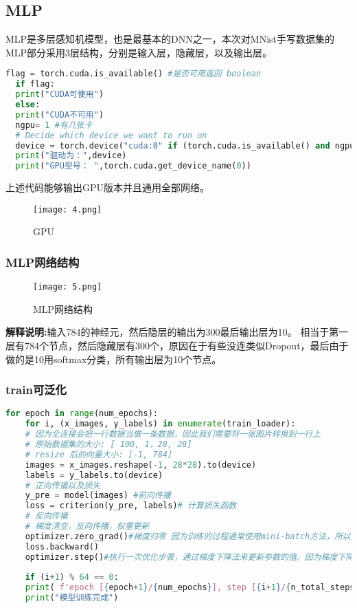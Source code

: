 \subsection{MLP}
 MLP是多层感知机模型，也是最基本的DNN之一，本次对MNist手写数据集的MLP部分采用3层结构，分别是输入层，隐藏层，以及输出层。\\
 \begin{lstlisting}[language=python]
  flag = torch.cuda.is_available() #是否可用返回 boolean
  if flag:
  print("CUDA可使用")
  else:
  print("CUDA不可用")
  ngpu= 1 #有几张卡
  # Decide which device we want to run on
  device = torch.device("cuda:0" if (torch.cuda.is_available() and ngpu > 0) else "cpu")
  print("驱动为：",device)
  print("GPU型号： ",torch.cuda.get_device_name(0))
 \end{lstlisting}
上述代码能够输出GPU版本并且通用全部网络。\\
	\begin{figure}[!h]
	\centering
	\texttt{[image: 4.png]}
	\caption{GPU}
	\label{fig:circuitm1}
\end{figure} \par
\subsubsection{MLP网络结构}
	\begin{figure}[!h]
	\centering
	\texttt{[image: 5.png]}
	\caption{MLP网络结构}
	\label{fig:circuitm1}
\end{figure} \par 
\textbf{解释说明:}输入784的神经元，然后隐层的输出为300最后输出层为10。
相当于第一层有784个节点，然后隐藏层有300个，原因在于有些没连类似Dropout，最后由于做的是10用softmax分类，所有输出层为10个节点。
\newpage
\subsubsection{train可泛化}
 \begin{lstlisting}[language=python]
	for epoch in range(num_epochs):
	for i, (x_images, y_labels) in enumerate(train_loader):
	# 因为全连接会把一行数据当做一条数据，因此我们需要将一张图片转换到一行上
	# 原始数据集的大小: [ 100, 1，28, 28]
	# resize 后的向量大小: [-1, 784]
	images = x_images.reshape(-1, 28*28).to(device)
	labels = y_labels.to(device)
	# 正向传播以及损失
	y_pre = model(images) #前向传播
	loss = criterion(y_pre, labels)# 计算损失函数
	# 反向传播
	# 梯度清空，反向传播，权重更新
	optimizer.zero_grad()#梯度归零 因为训练的过程通常使用mini-batch方法，所以如果不将梯度清零的话，梯度会与上一个batch的数据相关，因此该函数要写在反向传播和梯度下降之前。
	loss.backward()
	optimizer.step()#执行一次优化步骤，通过梯度下降法来更新参数的值。因为梯度下降是基于梯度的所以在执行optimizer.step()函数前应先执行loss.backward()函数来计算梯度。
	
	if (i+1) % 64 == 0:
	print( f'epoch [{epoch+1}/{num_epochs}], step [{i+1}/{n_total_steps}], Loss: {loss.item():.4f}')
	print("模型训练完成")
\end{lstlisting}
